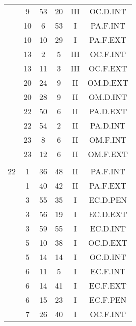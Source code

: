 \documentclass[12pt, a4paper]{article}
\begin{document}
\begin{multicols}{3}
{\begin{tabular}{c c c c c c}
	 	 	 	 & 9 & 53 & 20 & III & OC.D.INT\\%
	 	 	 	 & 10 & 6 & 53 & I & PA.F.INT\\%
	 	 	 	 & 10 & 10 & 29 & I & PA.F.EXT\\%
	 	 	 	 & 13 & 2 & 5 & III & OC.F.INT\\%
	 	 	 	 & 13 & 11 & 3 & III & OC.F.EXT\\%
	 	 	 	 & 20 & 24 & 9 & II & OM.D.EXT\\%
	 	 	 	 & 20 & 28 & 9 & II & OM.D.INT\\%
	 	 	 	 & 22 & 50 & 6 & II & PA.D.EXT\\%
	 	 	 	 & 22 & 54 & 2 & II & PA.D.INT\\%
	 	 	 	 & 23 & 8 & 6 & II & OM.F.INT\\%
	 	 	 	 & 23 & 12 & 6 & II & OM.F.EXT\\%
	 	 	 	 & & & & & \\%
	 	 	 	22 & 1 & 36 & 48 & II & PA.F.INT\\%
	 	 	 	 & 1 & 40 & 42 & II & PA.F.EXT\\%
	 	 	 	 & 3 & 55 & 35 & I & EC.D.PEN\\%
	 	 	 	 & 3 & 56 & 19 & I & EC.D.EXT\\%
	 	 	 	 & 3 & 59 & 55 & I & EC.D.INT\\%
	 	 	 	 & 5 & 10 & 38 & I & OC.D.EXT\\%
	 	 	 	 & 5 & 14 & 14 & I & OC.D.INT\\%
	 	 	 	 & 6 & 11 & 5 & I & EC.F.INT\\%
	 	 	 	 & 6 & 14 & 41 & I & EC.F.EXT\\%
	 	 	 	 & 6 & 15 & 23 & I & EC.F.PEN\\%
	 	 	 	 & 7 & 26 & 40 & I & OC.F.INT\\%

\end{tabular}}
\end{multicols}
\end{document}
